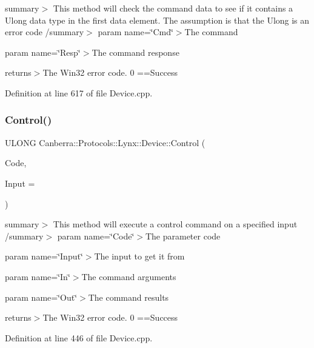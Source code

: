 summary$>$ This method will check the command data to see if it contains a Ulong data type in the first data element. The assumption is that the Ulong is an error code /summary$>$ param name=\char`\"{}\+Cmd\char`\"{}$>$The command

param name=\char`\"{}\+Resp\char`\"{}$>$The command response

returns$>$The Win32 error code. 0 ==Success

Definition at line 617 of file Device.\+cpp.

\mbox{\label{class_canberra_1_1_protocols_1_1_lynx_1_1_device_a17049b0e2fd8ab1d6f1181f7656ee6a7_a17049b0e2fd8ab1d6f1181f7656ee6a7}} 
\subsubsection{\texorpdfstring{Control()}{Control()}\hspace{0.1cm}{\footnotesize\ttfamily [3/4]}}
{\footnotesize\ttfamily U\+L\+O\+NG Canberra\+::\+Protocols\+::\+Lynx\+::\+Device\+::\+Control (\begin{DoxyParamCaption}\item[{L\+O\+NG}]{Code,  }\item[{U\+S\+H\+O\+RT}]{Input = {} }\end{DoxyParamCaption})}

summary$>$ This method will execute a control command on a specified input /summary$>$ param name=\char`\"{}\+Code\char`\"{}$>$The parameter code

param name=\char`\"{}\+Input\char`\"{}$>$The input to get it from

param name=\char`\"{}\+In\char`\"{}$>$The command arguments

param name=\char`\"{}\+Out\char`\"{}$>$The command results

returns$>$The Win32 error code. 0 ==Success

Definition at line 446 of file Device.\+cpp.

\mbox{\label{class_canberra_1_1_protocols_1_1_lynx_1_1_device_a0dbc14914d271155daf5270dde6a4809_a0dbc14914d271155daf5270dde6a4809}} 
